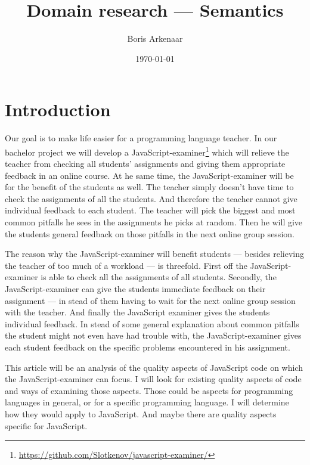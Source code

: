 \documentclass{article}
\begin{document}
 

\title{Domain research --- Semantics}
\author{Boris Arkenaar}
\date{\today}
\maketitle 


\section{Introduction} 

Our goal is to make life easier for a programming language teacher. In our
bachelor project we will develop a
JavaScript-examiner\footnote{\url{https://github.com/Slotkenov/javascript-examiner/}}
which will relieve the teacher from checking all students' assignments and
giving them appropriate feedback in an online course. At he same time, the
JavaScript-examiner will be for the benefit of the students as well. The
teacher simply doesn't have time to check the assignments of all the
students. And therefore the teacher cannot give individual feedback to each
student. The teacher will pick the biggest and most common pitfalls he sees in
the assignments he picks at random. Then he will give the students general
feedback on those pitfalls in the next online group session.

The reason why the JavaScript-examiner will benefit students --- besides
relieving the teacher of too much of a workload --- is threefold.  First off
the JavaScript-examiner is able to check all the assignments of all
students. Secondly, the JavaScript-examiner can give the students immediate
feedback on their assignment --- in stead of them having to wait for the next
online group session with the teacher. And finally the JavaScript examiner
gives the students individual feedback. In stead of some general explanation
about common pitfalls the student might not even have had trouble with, the
JavaScript-examiner gives each student feedback on the specific problems
encountered in his assignment.

This article will be an analysis of the quality aspects of JavaScript code on
which the JavaScript-examiner can focus. I will look for existing quality
aspects of code and ways of examining those aspects. Those could be aspects for
programming languages in general, or for a specific programming language. I
will determine how they would apply to JavaScript. And maybe there are quality
aspects specific for JavaScript.
\end{document}
